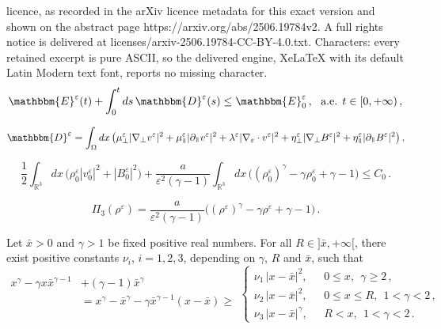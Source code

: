 \documentclass[10pt,a4paper]{amsart}
\def \R{{\mathbb{R}}}
\newcommand{\myparallel}{{\mkern3mu\vphantom{\perp}\vrule depth 0pt\mkern2mu\vrule depth 0pt\mkern3mu}}
\begin{document}
licence, as recorded in the arXiv licence metadata for this exact version and shown on the abstract page https://arxiv.org/abs/2506.19784v2. A full rights notice is delivered at licenses/arxiv-2506.19784-CC-BY-4.0.txt. Characters: every retained excerpt is pure ASCII, so the delivered engine, XeLaTeX with its default Latin Modern text font, reports no missing character.
\begin{equation}
\label{nrj-ineq-mhdeps}
\mathbbm{E}^\varepsilon(t) + \int_0^t ds \, \mathbbm{D}^\varepsilon(s) \leq  \mathbbm{E}_0^\varepsilon\,, \ \mbox{ a.e. } t \in [0,+\infty)\,,
\end{equation}

\begin{equation}
\label{dissip-D}
 \mathbbm{D}^\varepsilon=
\int_{\Omega} dx\, \big( \mu_\perp^\varepsilon |\nabla_\perp v^\varepsilon|^2 + \mu_\myparallel^\varepsilon |\partial_\myparallel v^\varepsilon|^2 +
\lambda^\varepsilon  |\nabla_\varepsilon \cdot v^\varepsilon|^2 +
\eta_\perp^\varepsilon |\nabla_\perp B^\varepsilon|^2 + \eta_\myparallel^\varepsilon |\partial_\myparallel B^\varepsilon|^2
\big)\,, 
\end{equation}

\begin{equation}
  \label{ineqC0-R}
  \frac 12 \int_{\R^3} dx\, \big( \rho_0^\varepsilon |v_0^\varepsilon|^2 + |B_0^\varepsilon|^2\big) + \frac{a}{\varepsilon^2(\gamma-1)}
  \int_{\R^3} dx\, \big( (\rho_0^\varepsilon)^\gamma - \gamma  \rho_0^\varepsilon 
  + \gamma -1\big) \leq C_0\,.
\end{equation}

\begin{equation}
\label{defPI-R}
\Pi_3(\rho^\varepsilon)=\frac{a}{\varepsilon^2(\gamma-1)}\big( (\rho^\varepsilon)^\gamma
- \gamma \rho^\varepsilon + \gamma - 1\big)\,.
\end{equation}

\begin{lemma}
  \label{lem:convex}
  Let $\bar{x}>0$ and $\gamma >1$ be fixed positive real numbers. For all $ R \in ]\bar{x}, + \infty [ $, there exist positive constants $\nu_i$, $i=1,2,3$,
    depending on $\gamma$, $R$ and $\bar{x}$, such that
  \begin{equation*}
    \begin{aligned}
      x^\gamma  - \gamma x\bar{x}^{\gamma -1} &+ (\gamma-1)\bar{x}^\gamma \\
      & = x^\gamma -\bar{x}^\gamma - \gamma \bar{x}^{\gamma -1}(x-\bar{x}) \geq\\
     & 
    \end{aligned}  
    \left \{
    \begin{aligned}
      \nu_1 \, |x-\bar{x}|^2, & \ \ \ 0 \leq x , \ \  \gamma \geq 2\,, \\
      \nu_2 \, |x-\bar{x}|^2, & \ \ \  0\leq x \leq R,  \ \  1<\gamma < 2\,, \\
      \nu_3 \, |x-\bar{x}|^\gamma, & \ \  \ R < x , \ \   1<\gamma < 2\,.
    \end{aligned}  
    \right.
  \end{equation*}  
\end{lemma}
\end{document}
